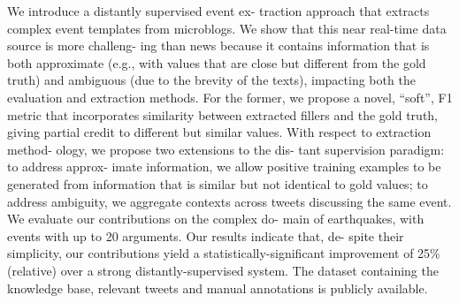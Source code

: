 We introduce a distantly supervised event ex- traction approach that extracts complex event templates from microblogs. We show that this near real-time data source is more challeng- ing than news because it contains information that is both approximate (e.g., with values that are close but different from the gold truth) and ambiguous (due to the brevity of the texts), impacting both the evaluation and extraction methods. For the former, we propose a novel, ``soft'', F1 metric that incorporates similarity between extracted fillers and the gold truth, giving partial credit to different but similar values. With respect to extraction method- ology, we propose two extensions to the dis- tant supervision paradigm: to address approx- imate information, we allow positive training examples to be generated from information that is similar but not identical to gold values; to address ambiguity, we aggregate contexts across tweets discussing the same event. We evaluate our contributions on the complex do- main of earthquakes, with events with up to 20 arguments. Our results indicate that, de- spite their simplicity, our contributions yield a statistically-significant improvement of 25\% (relative) over a strong distantly-supervised system. The dataset containing the knowledge base, relevant tweets and manual annotations is publicly available.
